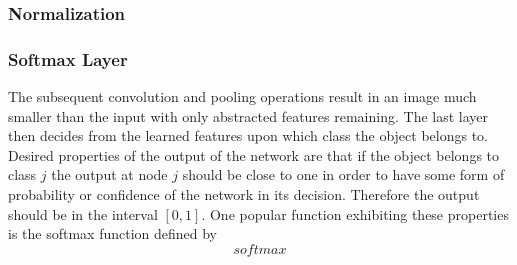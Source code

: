 

\subsubsection{Normalization}


\subsubsection{Softmax Layer}

The subsequent convolution and pooling operations result in an image much smaller than the input with only abstracted features remaining. The last layer then decides from the learned features upon which class the object belongs to. Desired properties of the output of the network are that if the object belongs to class $j$ the output at node $j$ should be close to one in order to have some form of probability or confidence of the network in its decision. Therefore the output should be in the interval $[0,1]$. One popular function exhibiting these properties is the softmax function defined by
\begin{equation}
softmax
\end{equation}

